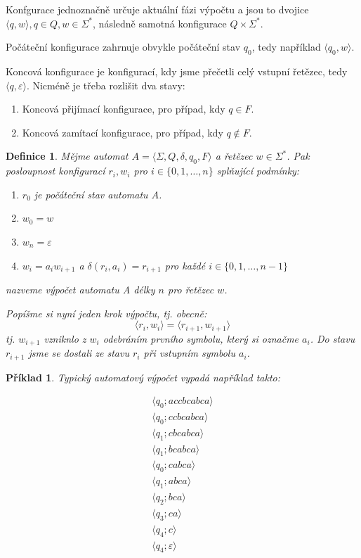 \documentclass[10pt,a4paper]{article}
\theoremstyle{note}
\newtheorem{definice}{Definice}
\newtheorem{priklad}{Příklad}
\begin{document}
Konfgurace jednoznačně určuje aktuální fázi výpočtu a jsou to dvojice $\langle q, w \rangle, q \in Q, w \in \Sigma^*$, následně
samotná konfigurace $Q \times \Sigma^*$.

Počáteční konfigurace zahrnuje obvykle počáteční stav $q_0$, tedy například $\langle q_0, w \rangle$.

Koncová konfigurace je konfigurací, kdy jsme přečetli celý vstupní řetězec,
tedy $\langle q, \varepsilon \rangle$. Nicméně je třeba rozlišit dva stavy:
\begin{enumerate}
\item
Koncová přijímací konfigurace, pro případ, kdy $q \in F$.

\item
Koncová zamítací konfigurace, pro případ, kdy $q \notin F$.
\end{enumerate}

\begin{definice}
Mějme automat $A = \langle \Sigma, Q, \delta, q_0, F \rangle$ a řetězec $w \in \Sigma^*$. Pak posloupnost
konfigurací $r_i, w_i$ pro $i \in \lbrace 0, 1, \ldots, n \rbrace$ splňující podmínky:
\begin{enumerate}
\item
$r_0$ je počáteční stav automatu $A$.

\item
$w_0 = w$

\item
$w_n = \varepsilon$

\item \label{vypocet-bod-4}
$w_i = a_i w_{i+1}$ a $\delta(r_i, a_i) = r_{i+1}$ pro každé $i \in \lbrace 0,1,\ldots,n-1 \rbrace$
\end{enumerate}
nazveme \textit{výpočet automatu A délky $n$ pro řetězec $w$}.

Popíšme si nyní jeden krok výpočtu, tj. obecně:
$$
\langle r_i, w_i \rangle = \langle r_{i+1}, w_{i+1} \rangle
$$
tj. $w_{i+1}$ vzniknlo z $w_i$ odebráním prvního symbolu, který si označme $a_i$. Do stavu $r_{i+1}$ jsme se dostali ze
stavu $r_i$ při vstupním symbolu $a_i$.
\end{definice}


\begin{priklad}
Typický automatový výpočet vypadá například takto:

\begin{gather*}
\langle q_0 ; accbcabca \rangle \\
\langle q_0 ; ccbcabca \rangle \\
\langle q_1 ; cbcabca \rangle \\
\langle q_1 ; bcabca \rangle \\
\langle q_0 ; cabca \rangle \\
\langle q_1 ; abca \rangle \\
\langle q_2 ; bca \rangle \\
\langle q_3 ; ca \rangle \\
\langle q_4 ; c \rangle \\
\langle q_4 ; \varepsilon \rangle \\
\end{gather*}
\end{priklad}
\end{document}
